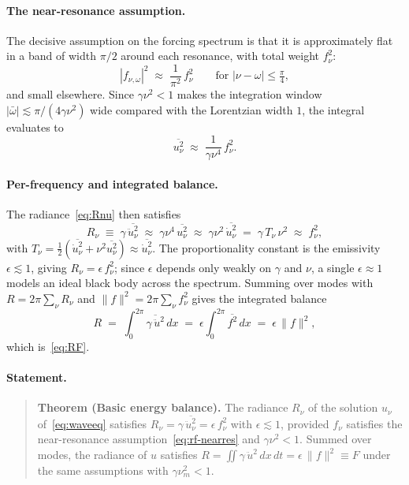 \paragraph{The near-resonance assumption.}
The decisive assumption on the forcing spectrum is that it is approximately flat in a band of width $\pi/2$ around each resonance, with total weight $f_\nu^2$:
\begin{equation}\label{eq:rf-nearres}
|f_{\nu,\omega}|^2 \;\approx\; \frac{1}{\pi^2}\, f_\nu^2
\qquad \text{for } |\nu - \omega| \le \tfrac{\pi}{4},
\end{equation}
and small elsewhere. Since $\gamma\nu^2 < 1$ makes the integration window $|\bar\omega| \lesssim \pi/(4\gamma\nu^2)$ wide compared with the Lorentzian width $1$, the integral evaluates to
\begin{equation}\label{eq:rf-unsq}
\overline{u_\nu^2} \;\approx\; \frac{1}{\gamma\nu^4}\, f_\nu^2.
\end{equation}

\paragraph{Per-frequency and integrated balance.}
The radiance~\eqref{eq:Rnu} then satisfies
\[
R_\nu \;\equiv\; \gamma\, \overline{\ddot u_\nu^2}
\;\approx\; \gamma\nu^4\, \overline{u_\nu^2}
\;\approx\; \gamma\nu^2\, \overline{\dot u_\nu^2}
\;=\; \gamma\, T_\nu\, \nu^2
\;\approx\; f_\nu^2,
\]
with $T_\nu = \tfrac{1}{2}(\overline{\dot u_\nu^2} + \nu^2\overline{u_\nu^2}) \approx \overline{\dot u_\nu^2}$. The proportionality constant is the emissivity $\epsilon \lesssim 1$, giving $R_\nu = \epsilon\, f_\nu^2$; since $\epsilon$ depends only weakly on $\gamma$ and $\nu$, a single $\epsilon \approx 1$ models an ideal black body across the spectrum. Summing over modes with $R = 2\pi\sum_\nu R_\nu$ and $\|f\|^2 = 2\pi\sum_\nu f_\nu^2$ gives the integrated balance
\begin{equation}\label{eq:rf-integrated}
R \;=\; \int_0^{2\pi} \overline{\gamma\, \ddot u^2}\, dx \;=\; \epsilon \int_0^{2\pi} \overline{f^2}\, dx \;=\; \epsilon\, \|f\|^2,
\end{equation}
which is~\eqref{eq:RF}.

\paragraph{Statement.}
\begin{quote}
\textbf{Theorem (Basic energy balance).} The radiance $R_\nu$ of the solution $u_\nu$ of~\eqref{eq:waveeq} satisfies $R_\nu = \gamma\,\overline{\ddot u_\nu^2} = \epsilon\, f_\nu^2$ with $\epsilon \lesssim 1$, provided $f_\nu$ satisfies the near-resonance assumption~\eqref{eq:rf-nearres} and $\gamma\nu^2 < 1$. Summed over modes, the radiance of $u$ satisfies $R = \iint \gamma\,\ddot u^2\, dx\, dt = \epsilon\,\|f\|^2 \equiv F$ under the same assumptions with $\gamma\nu_m^2 < 1$.
\end{quote}

